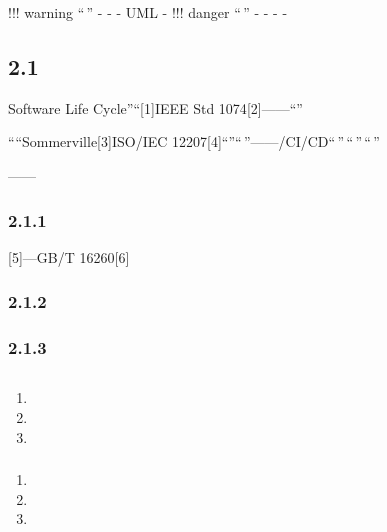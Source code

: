 !!! warning ``\,'' - - - UML - !!! danger ``\,'' - - - -

\subsection{2.1}\label{section-5}

Software Life Cycle''``{[}1{]}IEEE Std 1074{[}2{]}------``''

````Sommerville{[}3{]}ISO/IEC
12207{[}4{]}``''``\,''------/CI/CD``\,''\,``\,''\,``\,''

------

\subsubsection{2.1.1}\label{section-6}

{[}5{]}---GB/T 16260{[}6{]}

\subsubsection{2.1.2}\label{section-7}

\subsubsection{2.1.3}\label{section-8}

\subsection{}\label{section-9}

\subsubsection{}\label{section-10}

\begin{enumerate}
\def\labelenumi{\arabic{enumi}.}
\tightlist
\item
\item
\item
\end{enumerate}

\subsubsection{}\label{section-11}

\begin{enumerate}
\def\labelenumi{\arabic{enumi}.}
\tightlist
\item
\item
\item
\end{enumerate}

